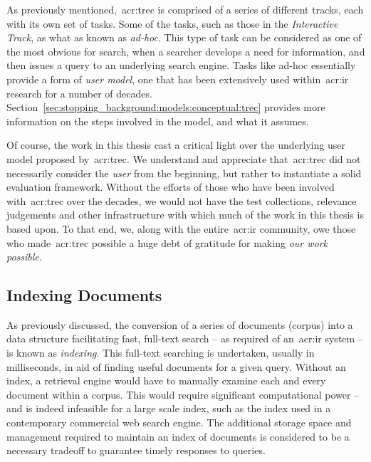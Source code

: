 As previously mentioned,~\gls{acr:trec} is comprised of a series of different tracks, each with its own set of tasks. Some of the tasks, such as those in the \emph{Interactive Track}, as what as known as \emph{ad-hoc}. This type of task can be considered as one of the most obvious for search, when a searcher develops a need for information, and then issues a query to an underlying search engine. Tasks like ad-hoc essentially provide a form of \emph{user model}, one that has been extensively used within~\gls{acr:ir} research for a number of decades. Section~\ref{sec:stopping_background:models:conceptual:trec} provides more information on the steps involved in the model, and what it assumes.

\noindent
{} Of course, the work in this thesis cast a critical light over the underlying user model proposed by~\gls{acr:trec}. We understand and appreciate that~\gls{acr:trec} did not necessarily consider the \emph{user} from the beginning, but rather to instantiate a solid evaluation framework. Without the efforts of those who have been involved with~\gls{acr:trec} over the decades, we would not have the test collections, relevance judgements and other infrastructure with which much of the work in this thesis is based upon. To that end, we, along with the entire~\gls{acr:ir} community, owe those who made~\gls{acr:trec} possible a huge debt of gratitude for making \emph{our work possible.}

\subsection{Indexing Documents}\label{sec:ir_background:basics:indexing}
As previously discussed, the conversion of a series of documents (corpus) into a data structure facilitating fast, full-text search -- as required of an~\gls{acr:ir} system -- is known as \emph{indexing}. This full-text searching is undertaken, usually in milliseconds, in aid of finding useful documents for a given query. Without an index, a retrieval engine would have to manually examine each and every document within a corpus. This would require significant computational power -- and is indeed infeasible for a large scale index, such as the index used in a contemporary commercial web search engine. The additional storage space and management required to maintain an index of documents is considered to be a necessary tradeoff to guarantee timely responses to queries.

